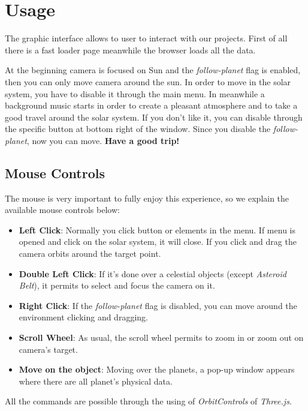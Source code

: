 \documentclass{article}
\begin{document}
\section{Usage}
The graphic interface allows to user to interact with our projects. First of all there is a fast loader page meanwhile the browser loads all the data.\par
At the beginning camera is focused on Sun and the \textit{follow-planet} flag is enabled, then you can only move camera around the sun. In order to move in the solar system, you have to disable it through the main menu.\newline
In meanwhile a background music starts in order to create a pleasant atmosphere and to take a good travel around the solar system. If you don't like it, you can disable through the specific button at bottom right of the window.\newline
Since you disable the \textit{follow-planet}, now you can move.\newline
\textbf{Have a good trip!}


\subsection{Mouse Controls}
The mouse is very important to fully enjoy this experience, so we explain the  available mouse controls below:
\begin{itemize}
	\item \textbf{Left Click}: Normally you click button or elements in the menu. If menu is opened and click on the solar system, it will close. If you click and drag the camera orbits around the target point.
	\item \textbf{Double Left Click}: If it's done over a celestial objects (except \textit{Asteroid Belt}), it permits to select and focus the camera on it.
	\item \textbf{Right Click}: If the \textit{follow-planet} flag is disabled, you can move around the environment clicking and dragging.
	\item \textbf{Scroll Wheel}: As usual, the scroll wheel permits to zoom in or zoom out on camera's target.
	\item \textbf{Move on the object}: Moving over the planets, a pop-up window appears where there are all planet's physical data.
\end{itemize}
All the commands are possible through the using of \textit{OrbitControls} of \textit{Three.js}.
\end{document}
